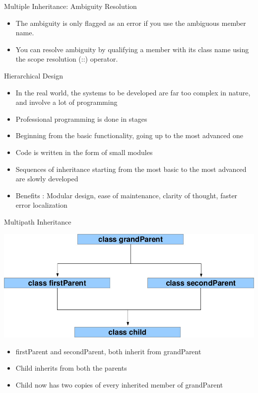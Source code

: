 \documentclass{beamer}
\begin{document}
\begin{frame}[fragile]{Multiple Inheritance: Ambiguity Resolution}
  \begin{itemize}
    \item The ambiguity is only flagged as an error if you use the ambiguous member name.\pause
    \item You can resolve ambiguity by qualifying a member with its class name using the scope resolution (::) operator.
  \end{itemize}
\end{frame}

\begin{frame}[fragile]{Hierarchical Design}
  \begin{itemize}
    \item In the real world, the systems to be developed are far too complex in nature, and involve a lot of programming\pause
    \item Professional programming is done in stages\pause
    \item Beginning from the basic functionality, going up to the most advanced one\pause
    \item Code is written in the form of small modules\pause
    \item Sequences of inheritance starting from the most basic to the most advanced are slowly developed\pause
    \item Benefits : Modular design, ease of maintenance, clarity of thought, faster error localization
  \end{itemize}
\end{frame}

\begin{frame}[fragile]{Multipath Inheritance}
  \begin{center}
  \includegraphics[scale=0.3]{lec.jpg}\pause
  \end{center}
  \begin{itemize}
  \item firstParent and secondParent, both inherit from grandParent\pause
  \item Child inherits from both the parents\pause
  \item Child now has two copies of every inherited member of grandParent
  \end{itemize}
\end{frame}
\end{document}
